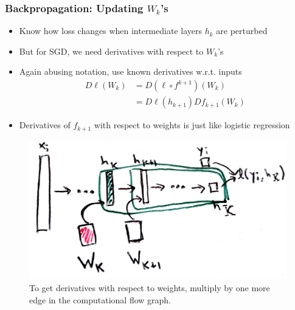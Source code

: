 \documentclass[10pt,mathserif]{beamer}
\begin{document}
\begin{frame}
  \frametitle{Backpropagation: Updating $W_k$'s}
  \begin{itemize}
  \item Know how loss changes when intermediate layers $h_k$ are perturbed
  \item But for SGD, we need derivatives with respect to $W_k$'s
  \item Again abusing notation, use known derivatives w.r.t. inputs
    \begin{align*}
      D\ell\left(W_k\right) &= D \left(\ell \circ f^{k + 1}\right)\left(W_k\right) \\
        &= D\ell\left(h_{k + 1}\right)Df_{k + 1}\left(W_k\right)
    \end{align*}
  \item Derivatives of $f_{k + 1}$ with respect to weights is just like logistic
    regression
  \end{itemize}
\begin{figure}[ht]
  \centering
  \includegraphics[width=0.35\paperwidth]{figure/backprop_inductive_w}
  \caption{To get derivatives with respect to weights, multiply by one more edge
    in the computational flow graph. \label{fig:backprop_inductive_w} }
\end{figure}

\end{frame}
\end{document}
